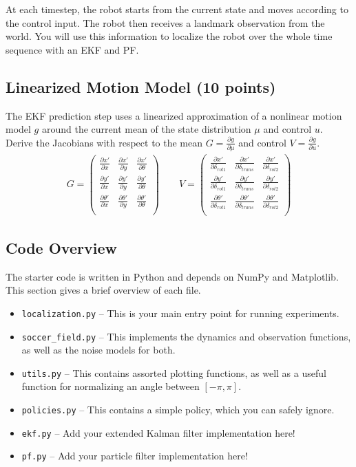 \documentclass{article}
\newcommand{\pderiv}[2]{\frac{\partial #1}{\partial #2}}
\newcommand{\?}{\stackrel{?}{=}}
\begin{document}
At each timestep, the robot starts from the current state and moves according to the control input.
The robot then receives a landmark observation from the world.
You will use this information to localize the robot over the whole time sequence with an EKF and PF.


\subsection{Linearized Motion Model (10 points)}

The EKF prediction step uses a linearized approximation of a nonlinear motion model $g$ around the current mean of the state distribution $\mu$ and control $u$.
Derive the Jacobians with respect to the mean $G = \pderiv{g}{\mu}$ and control $V = \pderiv{g}{u}$.
\begin{align*}
  G = \begin{pmatrix}
    \pderiv{x'}     {x} & \pderiv{x'}     {y} & \pderiv{x'}     {\theta} \\
    \pderiv{y'}     {x} & \pderiv{y'}     {y} & \pderiv{y'}     {\theta} \\
    \pderiv{\theta'}{x} & \pderiv{\theta'}{y} & \pderiv{\theta'}{\theta} \\
  \end{pmatrix}\qquad
  V = \begin{pmatrix}
    \pderiv{x'}     {\delta_{rot1}} & \pderiv{x'}     {\delta_{trans}} & \pderiv{x'}     {\delta_{rot2}} \\
    \pderiv{y'}     {\delta_{rot1}} & \pderiv{y'}     {\delta_{trans}} & \pderiv{y'}     {\delta_{rot2}} \\
    \pderiv{\theta'}{\delta_{rot1}} & \pderiv{\theta'}{\delta_{trans}} & \pderiv{\theta'}{\delta_{rot2}} \\
  \end{pmatrix}
\end{align*}


\subsection*{Code Overview}

The starter code is written in Python and depends on NumPy and Matplotlib.
This section gives a brief overview of each file.

\begin{itemize}
\item \verb|localization.py| -- This is your main entry point for running experiments.
\item \verb|soccer_field.py| -- This implements the dynamics and observation functions, as well as the noise models for both.
\item \verb|utils.py| -- This contains assorted plotting functions, as well as a useful function for normalizing an angle between $[-\pi, \pi]$.
\item \verb|policies.py| -- This contains a simple policy, which you can safely ignore.
\item \verb|ekf.py| -- Add your extended Kalman filter implementation here!
\item \verb|pf.py| -- Add your particle filter implementation here!
\end{itemize}
\end{document}
